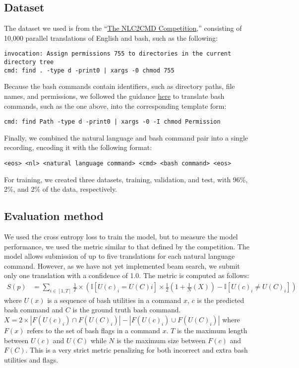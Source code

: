 \subsection{Dataset}
The dataset we used is from the ``\href{https://nlc2cmd.us-east.mybluemix.net/}{The NLC2CMD Competition},'' consisting of 10,000 parallel translations of English and bash, such as the following:
\begin{verbatim}
invocation: Assign permissions 755 to directories in the current directory tree
cmd: find . -type d -print0 | xargs -0 chmod 755
\end{verbatim}
Because the bash commands contain identifiers, such as directory paths, file names, and permissions, we followed the guidance \href{https://github.com/IBM/clai/tree/nlc2cmd}{here} to translate bash commands, such as the one above, into the corresponding template form:
\begin{verbatim}
cmd: find Path -type d -print0 | xargs -0 -I chmod Permission
\end{verbatim}
Finally, we combined the natural language and bash command pair into a single recording, encoding it with the following format:
\begin{verbatim}
<eos> <nl> <natural language command> <cmd> <bash command> <eos> 
\end{verbatim}
For training, we created three datasets, training, validation, and test, with
96\%, 2\%, and 2\% of the data, respectively.

\subsection{Evaluation method}
We used the cross entropy loss to train the model, but to measure the model performance, we used the metric similar to that defined by the competition. The model allows submission of up to five translations for each natural language command. However, as we have not yet implemented beam search, we submit only one translation with a confidence of 1.0. The metric is computed as follows:
\begin{align*}
	S(p) & =\sum_{i\in[1,T]}\frac{1}{T}\times\left(
	\mathbb{I}[U(c)_i=U(C)i]\times\frac{1}{2}\left(
		1+\frac{1}{N}\left(X\right)\right) -\mathbb{I}[U(c)_i\ne U(C)_i]
	\right)
\end{align*}
where $U(x)$ is a sequence of bash utilities in a command $x$, $c$ is the
predicted bash command and $C$ is the ground truth bash command. $X = 2\times
	|F(U(c)_i)\cap F(U(C)_i)| - |F(U(c)_i)\cup F(U(C)_i)|$ where $F(x)$ refers to
the set of bash flags in a command $x$. $T$ is the maximum length between
$U(c)$ and $U(C)$ while $N$ is the maximum size between $F(c)$ and $F(C)$. This
is a very strict metric penalizing for both incorrect and extra bash
utilities and flags.
